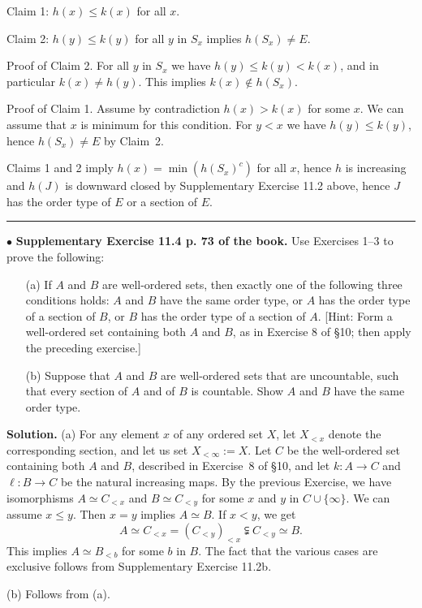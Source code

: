 \documentclass[12pt,letterpaper]{article}
\newcommand{\hs}{\bigskip\hrule\medskip}
\newcommand{\noi}{\noindent}%
\begin{document}
\noi Claim 1: $h(x)\le k(x)$ for all $x$. 

\noi Claim 2: $h(y)\le k(y)$ for all $y$ in $S_x$ implies $h(S_x)\ne E$. 

\noi Proof of Claim 2. For all $y$ in $S_x$ we have $h(y)\le k(y)<k(x)$, and in particular $k(x)\ne h(y)$. This implies $k(x)\notin h(S_x)$. 

\noi Proof of Claim 1. Assume by contradiction $h(x)>k(x)$ for some $x$. We can assume that $x$ is minimum for this condition. For $y<x$ we have $h(y)\le k(y)$, hence $h(S_x)\ne E$ by Claim~2.  

Claims 1 and 2 imply $h(x)=\min(h(S_x)^c)$ for all $x$, hence $h$ is increasing and $h(J)$ is downward closed by Supplementary Exercise 11.2 above, hence $J$ has the order type of $E$ or a section of $E$. 

\hs

\noi$\bullet$ \textbf{Supplementary Exercise 11.4 p. 73 of the book.} Use Exercises 1--3 to prove the following:
\begin{enumerate}
    \item[(a)] If $A$ and $B$ are well-ordered sets, then exactly one of the following three conditions holds: $A$ and $B$ have the same order type, or $A$ has the order type of a section of $B$, or $B$ has the order type of a section of $A$. [Hint: Form a well-ordered set containing both $A$ and $B$, as in Exercise 8 of §10; then apply the preceding exercise.]
    \item[(b)] Suppose that $A$ and $B$ are well-ordered sets that are uncountable, such that every section of $A$ and of $B$ is countable. Show $A$ and $B$ have the same order type.
\end{enumerate} 

\noi\textbf{Solution.} (a) For any element $x$ of any ordered set $X$, let $X_{<x}$ denote the corresponding section, and let us set $X_{<\infty}:=X$. Let $C$ be the well-ordered set containing both $A$ and $B$, described in Exercise~8 of §10, and let $k:A\to C$ and $\ell:B\to C$ be the natural increasing maps. By the previous Exercise, we have isomorphisms $A\simeq C_{<x}$ and $B\simeq C_{<y}$ for some $x$ and $y$ in $C\cup\{\infty\}$. We can assume $x\le y$. Then $x=y$ implies $A\simeq B$. If $x<y$, we get 
$$
A\simeq C_{<x}=(C_{<y})_{<x}\subsetneqq C_{<y}\simeq B.
$$ 
This implies $A\simeq B_{<b}$ for some $b$ in $B$. The fact that the various cases are exclusive follows from Supplementary Exercise 11.2b. 

\noi(b) Follows from (a). 
\end{document}
